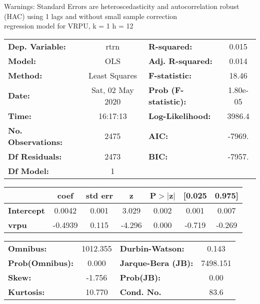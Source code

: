 Warnings: \newline
 [1] Standard Errors are heteroscedasticity and autocorrelation robust (HAC) using 1 lags and without small sample correction\\ 

regression model for VRPU, k = 1 h = 12\begin{center}
\begin{tabular}{lclc}
\toprule
\textbf{Dep. Variable:}    &       rtrn       & \textbf{  R-squared:         } &     0.015   \\
\textbf{Model:}            &       OLS        & \textbf{  Adj. R-squared:    } &     0.014   \\
\textbf{Method:}           &  Least Squares   & \textbf{  F-statistic:       } &     18.46   \\
\textbf{Date:}             & Sat, 02 May 2020 & \textbf{  Prob (F-statistic):} &  1.80e-05   \\
\textbf{Time:}             &     16:17:13     & \textbf{  Log-Likelihood:    } &    3986.4   \\
\textbf{No. Observations:} &        2475      & \textbf{  AIC:               } &    -7969.   \\
\textbf{Df Residuals:}     &        2473      & \textbf{  BIC:               } &    -7957.   \\
\textbf{Df Model:}         &           1      & \textbf{                     } &             \\
\bottomrule
\end{tabular}
\begin{tabular}{lcccccc}
                   & \textbf{coef} & \textbf{std err} & \textbf{z} & \textbf{P$> |$z$|$} & \textbf{[0.025} & \textbf{0.975]}  \\
\midrule
\textbf{Intercept} &       0.0042  &        0.001     &     3.029  &         0.002        &        0.001    &        0.007     \\
\textbf{vrpu}      &      -0.4939  &        0.115     &    -4.296  &         0.000        &       -0.719    &       -0.269     \\
\bottomrule
\end{tabular}
\begin{tabular}{lclc}
\textbf{Omnibus:}       & 1012.355 & \textbf{  Durbin-Watson:     } &    0.143  \\
\textbf{Prob(Omnibus):} &   0.000  & \textbf{  Jarque-Bera (JB):  } & 7498.151  \\
\textbf{Skew:}          &  -1.756  & \textbf{  Prob(JB):          } &     0.00  \\
\textbf{Kurtosis:}      &  10.770  & \textbf{  Cond. No.          } &     83.6  \\
\bottomrule
\end{tabular}
\end{center}


